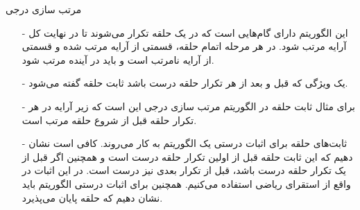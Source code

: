\begin{frame}{‌مرتب سازی درجی}
\begin{itemize}\itemr
\item[-]
این الگوریتم دارای گام‌هایی است که در یک حلقه تکرار می‌شوند تا در نهایت کل آرایه مرتب شود. در هر مرحله اتمام حلقه، قسمتی از آرایه مرتب شده و قسمتی از آرایه نامرتب است و باید در آینده مرتب شود.
\item[-]
یک ویژگی که قبل و بعد از هر تکرار حلقه درست باشد ثابت حلقه
گفته می‌شود.
\item[-]
برای مثال ثابت حلقه در الگوریتم مرتب سازی درجی این است که زیر آرایه
در هر تکرار حلقه قبل از شروع حلقه مرتب است.
\item[-]
ثابت‌های حلقه برای اثبات درستی یک الگوریتم به کار می‌روند. کافی است نشان دهیم که این ثابت حلقه قبل از اولین تکرار حلقه درست است و همچنین اگر قبل از یک تکرار حلقه درست باشد، قبل از تکرار بعدی نیز درست است. در این اثبات در واقع از استقرای ریاضی استفاده می‌کنیم.
همچنین برای اثبات درستی الگوریتم باید نشان دهیم که حلقه پایان می‌پذیرد.
\end{itemize}
\end{frame}
